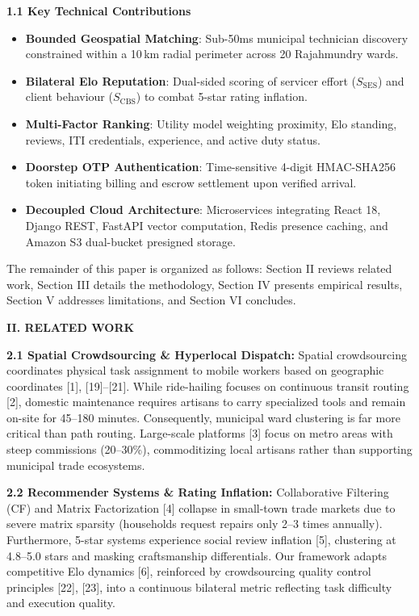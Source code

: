 \documentclass[10pt,twocolumn,a4paper]{article}
\begin{document}
\vspace{0.25em}
\noindent
\textbf{1.1 Key Technical Contributions}
\begin{itemize}
    \item \textbf{Bounded Geospatial Matching}: Sub-50ms municipal technician discovery constrained within a 10\,km radial perimeter across 20 Rajahmundry wards.
    \item \textbf{Bilateral Elo Reputation}: Dual-sided scoring of servicer effort ($S_{\text{SES}}$) and client behaviour ($S_{\text{CBS}}$) to combat 5-star rating inflation.
    \item \textbf{Multi-Factor Ranking}: Utility model weighting proximity, Elo standing, reviews, ITI credentials, experience, and active duty status.
    \item \textbf{Doorstep OTP Authentication}: Time-sensitive 4-digit HMAC-SHA256 token initiating billing and escrow settlement upon verified arrival.
    \item \textbf{Decoupled Cloud Architecture}: Microservices integrating React 18, Django REST, FastAPI vector computation, Redis presence caching, and Amazon S3 dual-bucket presigned storage.
\end{itemize}
The remainder of this paper is organized as follows: Section II reviews related work, Section III details the methodology, Section IV presents empirical results, Section V addresses limitations, and Section VI concludes.

\vspace{0.35em}
\noindent
\textbf{\large II. RELATED WORK}

\vspace{0.2em}
\noindent
\textbf{2.1 Spatial Crowdsourcing \& Hyperlocal Dispatch:} Spatial crowdsourcing coordinates physical task assignment to mobile workers based on geographic coordinates [1], [19]--[21]. While ride-hailing focuses on continuous transit routing [2], domestic maintenance requires artisans to carry specialized tools and remain on-site for 45--180 minutes. Consequently, municipal ward clustering is far more critical than path routing. Large-scale platforms [3] focus on metro areas with steep commissions (20--30\%), commoditizing local artisans rather than supporting municipal trade ecosystems.

\vspace{0.25em}
\noindent
\textbf{2.2 Recommender Systems \& Rating Inflation:} Collaborative Filtering (CF) and Matrix Factorization [4] collapse in small-town trade markets due to severe matrix sparsity (households request repairs only 2--3 times annually). Furthermore, 5-star systems experience social review inflation [5], clustering at 4.8--5.0 stars and masking craftsmanship differentials. Our framework adapts competitive Elo dynamics [6], reinforced by crowdsourcing quality control principles [22], [23], into a continuous bilateral metric reflecting task difficulty and execution quality.
\end{document}
